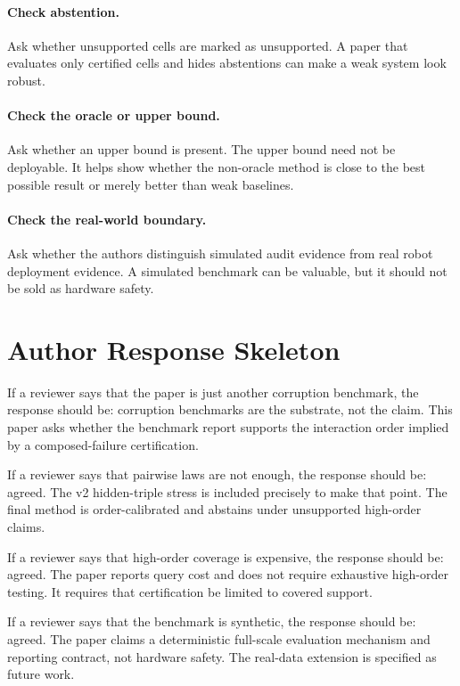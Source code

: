 \documentclass{article}
\begin{document}
\paragraph{Check abstention.}
Ask whether unsupported cells are marked as unsupported. A paper that evaluates only certified cells and hides abstentions can make a weak system look robust.

\paragraph{Check the oracle or upper bound.}
Ask whether an upper bound is present. The upper bound need not be deployable. It helps show whether the non-oracle method is close to the best possible result or merely better than weak baselines.

\paragraph{Check the real-world boundary.}
Ask whether the authors distinguish simulated audit evidence from real robot deployment evidence. A simulated benchmark can be valuable, but it should not be sold as hardware safety.

\section{Author Response Skeleton}

If a reviewer says that the paper is just another corruption benchmark, the response should be: corruption benchmarks are the substrate, not the claim. This paper asks whether the benchmark report supports the interaction order implied by a composed-failure certification.

If a reviewer says that pairwise laws are not enough, the response should be: agreed. The v2 hidden-triple stress is included precisely to make that point. The final method is order-calibrated and abstains under unsupported high-order claims.

If a reviewer says that high-order coverage is expensive, the response should be: agreed. The paper reports query cost and does not require exhaustive high-order testing. It requires that certification be limited to covered support.

If a reviewer says that the benchmark is synthetic, the response should be: agreed. The paper claims a deterministic full-scale evaluation mechanism and reporting contract, not hardware safety. The real-data extension is specified as future work.
\end{document}
